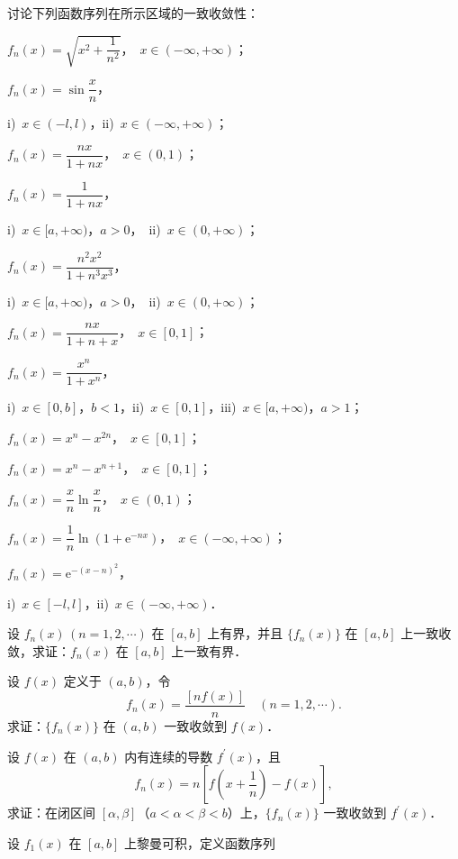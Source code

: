 \begin{xiti}
\item 讨论下列函数序列在所示区域的一致收敛性：
\begin{ziti}
\item $f_{n}(x)=\sqrt{x^{2}+\dfrac{1}{n^{2}}}$，\ $x\in(-\infty,+\infty)$；
\item $f_{n}(x)=\sin\dfrac{x}{n}$，\par
  i)\ $x\in(-l,l)$，\quad ii)\ $x\in(-\infty,+\infty)$；
\item $f_{n}(x)=\dfrac{nx}{1+nx}$，\ $x\in(0,1)$；
\item $f_{n}(x)=\dfrac{1}{1+nx}$，\par
  i)\ $x\in[a,+\infty)$，$a>0$，\ ii)\ $x\in(0,+\infty)$；
\item $f_{n}(x)=\dfrac{n^{2}x^{2}}{1+n^{3}x^{3}}$，\par
  i)\ $x\in[a,+\infty)$，$a>0$，\ ii)\ $x\in(0,+\infty)$；
\item $f_{n}(x)=\dfrac{nx}{1+n+x}$，\ $x\in[0,1]$；
\item $f_{n}(x)=\dfrac{x^{n}}{1+x^{n}}$，\par
  i)\ $x\in[0,b]$，$b<1$，\quad ii)\ $x\in[0,1]$，\quad iii)\ $x\in[a,+\infty)$，$a>1$；
\item $f_{n}(x)=x^{n}-x^{2n}$，\ $x\in[0,1]$；
\item $f_{n}(x)=x^{n}-x^{n+1}$，\ $x\in[0,1]$；
\item $f_{n}(x)=\dfrac{x}{n}\ln\dfrac{x}{n}$，\ $x\in(0,1)$；
\item $f_{n}(x)=\dfrac{1}{n}\ln\left(1+\mathrm{e}^{-nx}\right)$，\ $x\in(-\infty,+\infty)$；
\item $f_{n}(x)=\mathrm{e}^{-(x-n)^{2}}$，\par
  i)\ $x\in[-l,l]$，\quad ii)\ $x\in(-\infty,+\infty)$．
\end{ziti}
\item 设 $f_{n}(x)\,(n=1,2,\cdots)$ 在 $[a,b]$ 上有界，并且 $\{f_{n}(x)\}$ 在 $[a,b]$ 上一致收敛，求证：$f_{n}(x)$ 在 $[a,b]$ 上一致有界．
\item 设 $f(x)$ 定义于 $(a,b)$，令
\[
f_{n}(x)=\frac{\left[nf(x)\right]}{n}\quad(n=1,2,\cdots).
\]
求证：$\{f_{n}(x)\}$ 在 $(a,b)$ 一致收敛到 $f(x)$．
\item 设 $f(x)$ 在 $(a,b)$ 内有连续的导数 $f^{\prime}(x)$，且
\[
f_{n}(x)=n\left[f\left(x+\frac{1}{n}\right)-f(x)\right],
\]
求证：在闭区间 $[\alpha,\beta]$（$a<\alpha<\beta<b$）上，$\{f_{n}(x)\}$ 一致收敛到 $f^{\prime}(x)$．
\item 设 $f_{1}(x)$ 在 $[a,b]$ 上黎曼可积，定义函数序列

\end{xiti}

